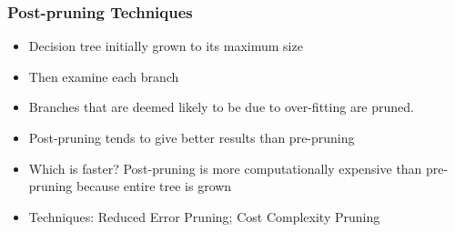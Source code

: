 \begin{frame}[fragile]\frametitle{Post-pruning Techniques}
\begin{itemize}
\item Decision tree initially grown to its maximum size
\item Then examine each branch
\item Branches that are deemed likely to be due to over-fitting are pruned.
\item Post-pruning tends to give better results than pre-pruning
\item Which is faster? Post-pruning is more computationally expensive than pre-pruning because entire tree is grown
\item Techniques: Reduced Error Pruning;
Cost Complexity Pruning

\end{itemize}
\end{frame}


%
%
%



